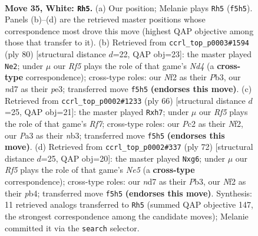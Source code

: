\documentclass[11pt]{article}
\begin{document}
\clearpage

\begin{figure}[p]\centering
\begin{subfigure}{0.46\textwidth}\centering
\resizebox{\linewidth}{!}{%
\newchessgame
\chessboard[
  setfen={6r1/1b1n2k1/8/3p1R2/p7/P5P1/1PP2N2/2K5 w - - 4 35},
  showmover=false,
  pgfstyle=straightmove, color=movearrow, markmove={f5-h5}
]}
\caption{}
\end{subfigure}\hfill
\begin{subfigure}{0.46\textwidth}\centering
\resizebox{\linewidth}{!}{%
\newchessgame
\chessboard[
  setfen={4r3/p2R4/2p3k1/8/2PN2P1/1P2p1b1/P7/1K6 w - - 5 41},
  showmover=false,
  pgfstyle=straightmove, color=movearrow, markmove={d4-e2}
]}
\caption{}
\end{subfigure}
\\[4pt]
\begin{subfigure}{0.46\textwidth}\centering
\resizebox{\linewidth}{!}{%
\newchessgame
\chessboard[
  setfen={3r4/5R1p/2k5/p5P1/Pp3P1P/1n6/5N2/6K1 w - - 0 34},
  showmover=false,
  pgfstyle=straightmove, color=movearrow, markmove={f7-h7}
]}
\caption{}
\end{subfigure}\hfill
\begin{subfigure}{0.46\textwidth}\centering
\resizebox{\linewidth}{!}{%
\newchessgame
\chessboard[
  setfen={2r3k1/R5p1/6p1/4N3/1p2n2p/1P5P/6PK/8 w - - 2 37},
  showmover=false,
  pgfstyle=straightmove, color=movearrow, markmove={e5-g6}
]}
\caption{}
\end{subfigure}
\caption{\textbf{Move 35, White: \texttt{Rh5}.} (a) Our position; Melanie plays \texttt{Rh5} (\texttt{f5h5}). Panels (b)--(d) are the retrieved master positions whose correspondence most drove this move (highest QAP objective among those that transfer to it). (b) Retrieved from \texttt{ccrl\_top\_p0003\#1594} (ply 80) [structural distance $d$=22, QAP obj=23]: the master played \texttt{Ne2}; under $\mu$ our \emph{Rf5} plays the role of that game's \emph{Nd4} (a \textbf{cross-type} correspondence); cross-type roles: our \emph{N}f2 as their \emph{P}b3, our \emph{n}d7 as their \emph{p}e3; transferred move \texttt{f5h5} \textbf{(endorses this move)}. (c) Retrieved from \texttt{ccrl\_top\_p0002\#1233} (ply 66) [structural distance $d$=25, QAP obj=21]: the master played \texttt{Rxh7}; under $\mu$ our \emph{Rf5} plays the role of that game's \emph{Rf7}; cross-type roles: our \emph{P}c2 as their \emph{N}f2, our \emph{P}a3 as their \emph{n}b3; transferred move \texttt{f5h5} \textbf{(endorses this move)}. (d) Retrieved from \texttt{ccrl\_top\_p0002\#337} (ply 72) [structural distance $d$=25, QAP obj=20]: the master played \texttt{Nxg6}; under $\mu$ our \emph{Rf5} plays the role of that game's \emph{Ne5} (a \textbf{cross-type} correspondence); cross-type roles: our \emph{n}d7 as their \emph{P}b3, our \emph{N}f2 as their \emph{p}b4; transferred move \texttt{f5h5} \textbf{(endorses this move)}. Synthesis: 11 retrieved analogs transferred to \texttt{Rh5} (summed QAP objective 147, the strongest correspondence among the candidate moves); Melanie committed it via the \texttt{search} selector.}
\label{fig:thought-m68}
\end{figure}
\end{document}
